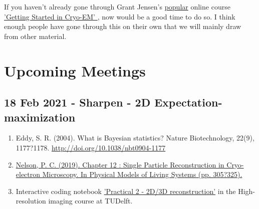 \documentclass[11pt, oneside]{article}   	%
\begin{document}
If you haven't already gone through Grant Jensen's \href{https://www.caltech.edu/about/news/grant-jensen-cryo-em}{popular} online course \href{https://jensenlab.caltech.edu/courses/}{'Getting Started in Cryo-EM' }, now would be a good time to do so. I think enough people have gone through this on their own that we will mainly draw from other material. 

\pagebreak
\section{Upcoming Meetings}

\pagebreak
\subsection{18 Feb 2021 - Sharpen - 2D Expectation-maximization}
\begin{enumerate}
	\item Eddy, S. R. (2004). What is Bayesian statistics? Nature Biotechnology, 22(9), 1177?1178. \url{http://doi.org/10.1038/nbt0904-1177}
	\item \href{https://repository.upenn.edu/cgi/viewcontent.cgi?article=1665&context=physics_papers}{Nelson, P. C. (2019). Chapter 12 : Single Particle Reconstruction in Cryo-electron Microscopy. In Physical Models of Living Systems (pp. 305?325).}
	\item Interactive coding notebook \href{https://gitlab.tudelft.nl/aj-lab/teaching/-/wikis/NB4020}{'Practical 2 - 2D/3D reconstruction'} in the High-resolution imaging course at TUDelft.
\end{enumerate}
\end{document}
